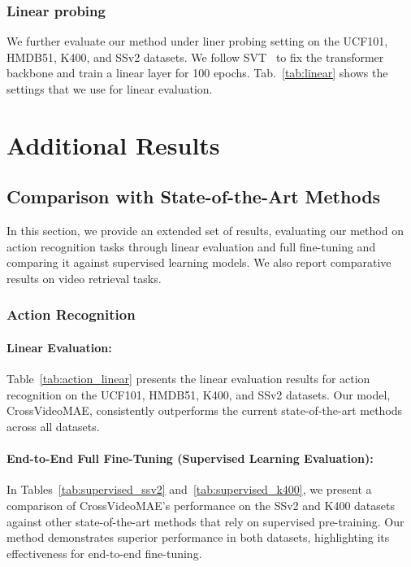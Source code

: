\subsubsection{Linear probing} 
We further evaluate our method under liner probing setting on the UCF101, HMDB51, K400, and SSv2 datasets. We follow SVT~\cite{ranasinghe2022self} to fix the transformer backbone and train a linear layer for 100 epochs. Tab.~\ref{tab:linear} shows the settings that we use for linear evaluation.






\section{Additional Results}
\label{sec:additional}

\subsection{Comparison with State-of-the-Art Methods}
In this section, we provide an extended set of results, evaluating our method on action recognition tasks through linear evaluation and full fine-tuning and comparing it against supervised learning models. We also report comparative results on video retrieval tasks.

\subsubsection{Action Recognition}

\paragraph{Linear Evaluation:}

Table~\ref{tab:action_linear} presents the linear evaluation results for action recognition on the UCF101, HMDB51, K400, and SSv2 datasets. Our model, CrossVideoMAE, consistently outperforms the current state-of-the-art methods across all datasets.

\paragraph{End-to-End Full Fine-Tuning (Supervised Learning Evaluation):}

In Tables~\ref{tab:supervised_ssv2} and~\ref{tab:supervised_k400}, we present a comparison of CrossVideoMAE's performance on the SSv2 and K400 datasets against other state-of-the-art methods that rely on supervised pre-training. Our method demonstrates superior performance in both datasets, highlighting its effectiveness for end-to-end fine-tuning.

